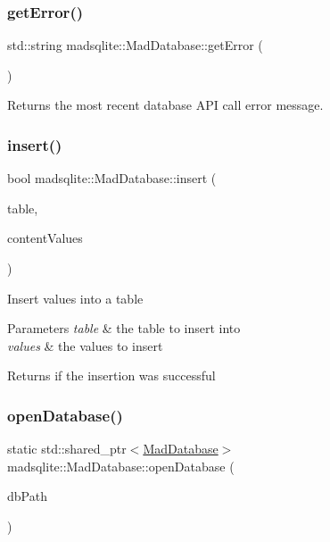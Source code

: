 \subsubsection{\texorpdfstring{get\+Error()}{getError()}}
{\footnotesize\ttfamily std\+::string madsqlite\+::\+Mad\+Database\+::get\+Error (\begin{DoxyParamCaption}{ }\end{DoxyParamCaption})}

\begin{DoxyReturn}{Returns}
the most recent database A\+PI call error message. 
\end{DoxyReturn}
\hypertarget{classmadsqlite_1_1_mad_database_a29207a153e3a92eec7d718efd4c7b3a3}{}\label{classmadsqlite_1_1_mad_database_a29207a153e3a92eec7d718efd4c7b3a3} 
\subsubsection{\texorpdfstring{insert()}{insert()}}
{\footnotesize\ttfamily bool madsqlite\+::\+Mad\+Database\+::insert (\begin{DoxyParamCaption}\item[{std\+::string const \&}]{table,  }\item[{\hyperlink{classmadsqlite_1_1_mad_content_values}{Mad\+Content\+Values} \&}]{content\+Values }\end{DoxyParamCaption})}

Insert values into a table


\begin{DoxyParams}{Parameters}
{\em table} & the table to insert into \\
\hline
{\em values} & the values to insert \\
\hline
\end{DoxyParams}
\begin{DoxyReturn}{Returns}
if the insertion was successful 
\end{DoxyReturn}
\hypertarget{classmadsqlite_1_1_mad_database_a68c5b61e4cf000f4947f9c43a2c12338}{}\label{classmadsqlite_1_1_mad_database_a68c5b61e4cf000f4947f9c43a2c12338} 
\subsubsection{\texorpdfstring{open\+Database()}{openDatabase()}}
{\footnotesize\ttfamily static std\+::shared\+\_\+ptr$<$\hyperlink{classmadsqlite_1_1_mad_database}{Mad\+Database}$>$ madsqlite\+::\+Mad\+Database\+::open\+Database (\begin{DoxyParamCaption}\item[{std\+::string const \&}]{db\+Path }\end{DoxyParamCaption})\hspace{0.3cm}{\ttfamily [static]}}

